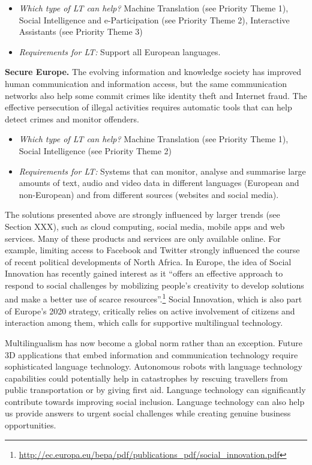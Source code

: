 \begin{multicols}{2}
\begin{itemize}
\item \emph{Which type of LT can help?} Machine Translation (see Priority Theme 1), Social Intelligence and e-Participation (see Priority Theme 2), Interactive Assistants (see Priority Theme 3)
\item \emph{Requirements for LT:} Support all European languages.
\end{itemize}

\textbf{Secure Europe.} The evolving information and knowledge society has improved human communication and information access, but the same communication networks also help some commit crimes like identity theft and Internet fraud. The effective persecution of illegal activities requires automatic tools that can help detect crimes and monitor offenders. 

\begin{itemize}
\item \emph{Which type of LT can help?} Machine Translation (see Priority Theme 1), Social Intelligence (see Priority Theme 2)
\item \emph{Requirements for LT:} Systems that can monitor, analyse and summarise large amounts of text, audio and video data in different languages (European and non-European) and from different sources (websites and social media).
\end{itemize}

The solutions presented above are strongly influenced by larger trends (see Section XXX), such as cloud computing, social media, mobile apps and web services. Many of these products and services are only available online. For example, limiting access to Facebook and Twitter strongly influenced the course of recent political developments of North Africa. In Europe, the idea of Social Innovation has recently gained interest as it “offers an effective approach to respond to social challenges by mobilizing people's creativity to develop solutions and make a better use of scarce resources”.\footnote{\url{http://ec.europa.eu/bepa/pdf/publications_pdf/social_innovation.pdf}} Social Innovation, which is also part of Europe’s 2020 strategy, critically relies on active involvement of citizens and interaction among them, which calls for supportive multilingual technology. 

Multilingualism has now become a global norm rather than an exception. Future 3D applications that embed information and communication technology require sophisticated language technology. Autonomous robots with language technology capabilities could potentially help in catastrophes by rescuing travellers from public transportation or by giving first aid.  Language technology can significantly contribute towards improving social inclusion. Language technology can also help us provide answers to urgent social challenges while creating genuine business opportunities.


\end{multicols}
